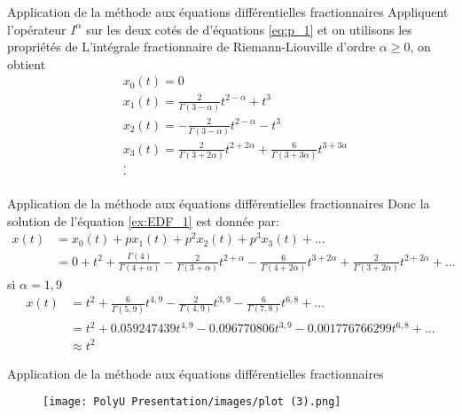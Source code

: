 \documentclass{sintefbeamer}
\begin{document}
\begin{frame}{Application de la méthode aux équations différentielles fractionnaires}
    Appliquent l'opérateur $I^{\alpha}$ sur les deux cotés de d'équations \ref{eq:p_1} et on utilisons les propriétés de L'intégrale fractionnaire de Riemann-Liouville d'ordre $\alpha \geq 0$, on obtient 
    \begin{align*}
    &x _0(t)=0\\
    & x_1(t) = \frac{2}{\Gamma(3-\alpha)}t^{2-\alpha} + t^3\\
    & x_2(t) = -\frac{2}{\Gamma(3-\alpha)} t^{2-\alpha} -t^3\\
    & x_3(t) = \frac{2}{\Gamma(3+2\alpha)}t^{2+2\alpha} + \frac{6}{\Gamma(3+3\alpha)} t^{3+3\alpha} \\
    & .\\
    & .\\
    \end{align*}
\end{frame}


\begin{frame}{Application de la méthode aux équations différentielles fractionnaires}
    Donc la solution de l'équation \ref{ex:EDF_1} est donnée par:
\begin{align*}
        x(t) &= x_0(t) + px_1(t) + p^2x_2(t) + p^3x_3(t)+...\\
        & = 0 + t^2 + \frac{\Gamma(4)}{\Gamma(4+\alpha)} -\frac{2}{\Gamma(3+\alpha)} t^{2+\alpha} -\frac{6}{\Gamma(4+2\alpha)} t^{3+2\alpha} + \frac{2}{\Gamma(3+2\alpha)}t^{2+2\alpha} +...
\end{align*}
si $\alpha = 1,9$
\begin{align*}
    x(t) &= t^2 + \frac{6}{\Gamma(5,9)}t^{4,9} -\frac{2}{\Gamma(4,9)}t^{3,9} - \frac{6}{\Gamma(7,8)}t^{6,8} + ...\\
    &= t^2 + 0.059247439t^{4,9} - 0.096770806t^{3,9} - 0.001776766299 t^{6,8} + ...\\
    & \approx t^2
\end{align*}
\end{frame}


\begin{frame}{Application de la méthode aux équations différentielles fractionnaires}
    \begin{figure}[H]
    \centering
    \texttt{[image: PolyU Presentation/images/plot (3).png]}
\end{figure}
\end{frame}
\end{document}
